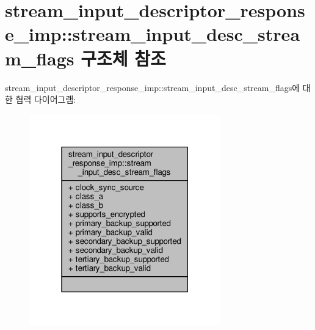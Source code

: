 \hypertarget{structavdecc__lib_1_1stream__input__descriptor__response__imp_1_1stream__input__desc__stream__flags}{}\section{stream\+\_\+input\+\_\+descriptor\+\_\+response\+\_\+imp\+:\+:stream\+\_\+input\+\_\+desc\+\_\+stream\+\_\+flags 구조체 참조}
\label{structavdecc__lib_1_1stream__input__descriptor__response__imp_1_1stream__input__desc__stream__flags}


stream\+\_\+input\+\_\+descriptor\+\_\+response\+\_\+imp\+:\+:stream\+\_\+input\+\_\+desc\+\_\+stream\+\_\+flags에 대한 협력 다이어그램\+:
\nopagebreak
\begin{figure}[H]
\begin{center}
\leavevmode
\includegraphics[width=235pt]{structavdecc__lib_1_1stream__input__descriptor__response__imp_1_1stream__input__desc__stream__flags__coll__graph}
\end{center}
\end{figure}
